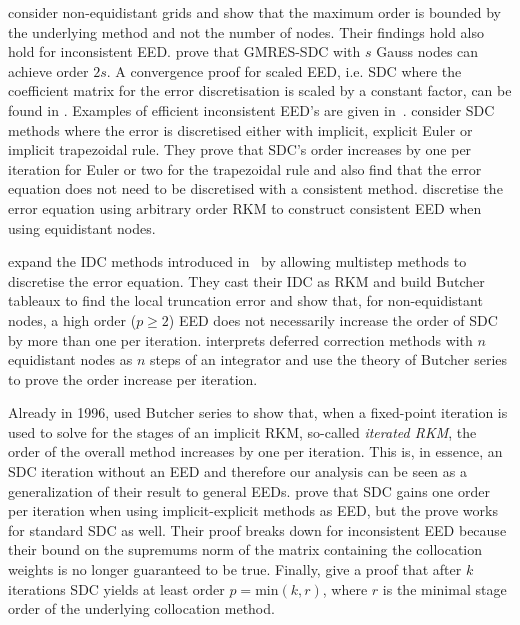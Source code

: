 \documentclass[sn-mathphys-num]{sn-jnl}%
\newcommand{\revb}[1]{#1}%
\theoremstyle{thmstyleone}%
\theoremstyle{thmstyletwo}%
\theoremstyle{thmstylethree}%
\begin{document}
\citep{HagstromZhou2006} consider non-equidistant grids and show that the maximum order is bounded by the underlying method and not the number of nodes. 
Their findings hold also hold for inconsistent EED. 
\citep{HuangEtAl2006} prove that GMRES-SDC with $s$ Gauss nodes can achieve order $2s$. 
A convergence proof for scaled EED, i.e. SDC where the coefficient matrix for the error discretisation is scaled by a constant factor,  can be found in \citep{ShuEtAl2007}. 
Examples of efficient inconsistent EED's are given in~\citep{Weiser2014, Speck2017}.
\citep{CausleySeal2019} consider SDC methods where the error is discretised either with implicit, explicit Euler or implicit trapezoidal rule. 
They prove that SDC's order increases by one per iteration for Euler or two for the trapezoidal rule and also find that the error equation does not need to be discretised with a consistent method. 
\citep{ChristliebEtAl2010_MoC} discretise the error equation using arbitrary order RKM to construct consistent EED when using equidistant nodes.

\citep{ChristliebEtAl2009} expand the IDC methods introduced in~\citep{ChristliebEtAl2010_MoC} by allowing multistep methods to discretise the error equation. 
They cast their IDC as RKM and build Butcher tableaux to find the local truncation error and show that, for non-equidistant nodes, a high order ($p \geq 2$) EED does not necessarily increase the order of SDC by more than one per iteration. \citep{HairerOID78} interprets deferred correction methods with $n$ equidistant nodes as $n$ steps of an integrator and use the theory of Butcher series to prove the order increase per iteration.

\revb{Already in 1996, \citet{jackson1996analysis} used Butcher series to show that, when a fixed-point iteration is used to solve for the stages of an implicit RKM, so-called \emph{iterated RKM},  the order of the overall method increases by one per iteration.
This is, in essence, an SDC iteration without an EED and therefore our analysis can be seen as a generalization of their result to general EEDs.}
\citet{RuprechtSpeck2016} prove that SDC gains one order per iteration when using implicit-explicit methods as EED, but the prove works for standard SDC as well. 
Their proof breaks down for inconsistent EED because their bound on the supremums norm of the matrix containing the collocation weights is no longer guaranteed to be true.
Finally, \citep{VanDerHouwen1991} give a proof that after $k$ iterations SDC yields at least order $p = \text{min}(k,r)$, where $r$ is the minimal stage order of the underlying collocation method.
\end{document}
